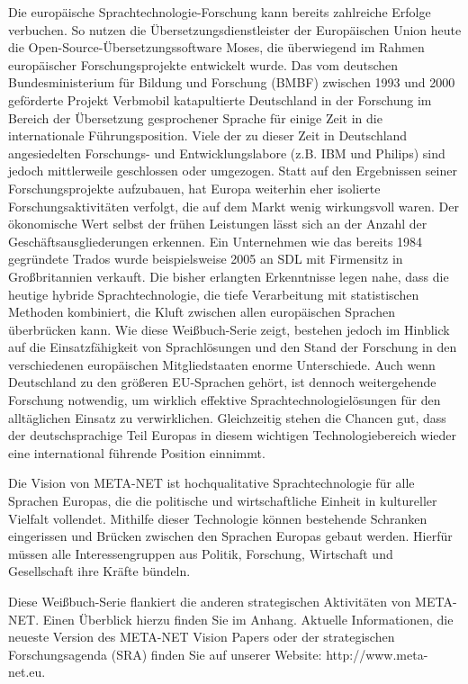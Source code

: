 \documentclass[]{../../metanetpaper}
\begin{document}
\begin{Parallel}[c]{79mm}{78mm}
{Die europäische Sprach\-tech\-no\-lo\-gie-Forschung kann bereits zahlreiche Erfolge verbuchen. So nutzen die Übersetzungsdienstleister der Europäischen Union heute die Open-Source-Übersetzungssoftware Moses, die überwiegend im Rahmen europäischer Forschungsprojekte entwickelt wurde. Das vom deutschen Bundesministerium für Bildung und Forschung (BMBF) zwischen 1993 und 2000 geförderte Projekt Verbmobil katapultierte Deutschland in der Forschung im Bereich der Übersetzung gesprochener Sprache für einige Zeit in die internationale Führungsposition. Viele der zu dieser Zeit in Deutschland angesiedelten Forschungs- und Entwicklungslabore (z.B. IBM und Philips) sind jedoch mittlerweile geschlossen oder umgezogen. Statt auf den Ergebnissen seiner Forschungsprojekte aufzubauen, hat Europa weiterhin eher isolierte Forschungsaktivitäten verfolgt, die auf dem Markt wenig wirkungsvoll waren. Der ökonomische Wert selbst der frühen Leistungen lässt sich an der Anzahl der Geschäftsausgliederungen erkennen. Ein Unternehmen wie das bereits 1984 gegründete Trados wurde beispielsweise 2005 an SDL mit Firmensitz in Großbritannien verkauft.
Die bisher erlangten Erkenntnisse legen nahe, dass die heutige hybride Sprachtechnologie, die tiefe Verarbeitung mit statistischen Methoden kombiniert, die Kluft zwischen allen europäischen Sprachen überbrücken kann. Wie diese Weißbuch-Serie zeigt, bestehen jedoch im Hinblick auf die Einsatzfähigkeit von Sprachlösungen und den Stand der Forschung in den verschiedenen europäischen Mitgliedstaaten enorme Unterschiede. Auch wenn Deutschland zu den größeren EU-Sprachen gehört, ist dennoch weitergehende Forschung notwendig, um wirklich effektive Sprachtechnologielösungen für den alltäglichen Einsatz zu verwirklichen. Gleichzeitig stehen die Chancen gut, dass der deutschsprachige Teil Europas in diesem wichtigen Technologiebereich wieder eine international führende Position einnimmt. 

Die Vision von META-NET ist hochqualitative Sprachtechnologie für alle Sprachen Europas, die die politische und wirtschaftliche Einheit in kultureller Vielfalt vollendet. Mithilfe dieser Technologie können bestehende Schranken eingerissen und Brücken zwischen den Sprachen Europas gebaut werden. Hierfür müssen alle Interessengruppen aus Politik, Forschung, Wirtschaft und Gesellschaft ihre Kräfte bündeln.

Diese Weißbuch-Serie flankiert die anderen strategischen Aktivitäten von META-NET. Einen Überblick hierzu finden Sie im Anhang. Aktuelle Informationen, die neueste Version des META-NET Vision Papers\cite{Meta1} oder der strategischen Forschungsagenda (SRA) finden Sie auf unserer Website: http://www.meta-net.eu.
  }
  

\end{Parallel}
\end{document}
